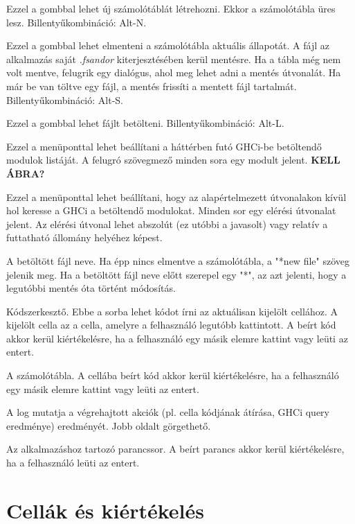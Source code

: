 \begin{compactenum}
	\item Ezzel a gombbal lehet új számolótáblát létrehozni. Ekkor a számolótábla üres lesz. Billentyűkombináció: Alt-N.
	\item Ezzel a gombbal lehet elmenteni a számolótábla aktuális állapotát. A fájl az alkalmazás saját \textit{.fsandor} kiterjesztésében kerül mentésre. Ha a tábla még nem volt mentve, felugrik egy dialógus, ahol meg lehet adni a mentés útvonalát. Ha már be van töltve egy fájl, a mentés frissíti a mentett fájl tartalmát. Billentyűkombináció: Alt-S.
	\item Ezzel a gombbal lehet fájlt betölteni. Billentyűkombináció: Alt-L.
	\item Ezzel a menüponttal lehet beállítani a háttérben futó GHCi-be betöltendő modulok listáját. A felugró szövegmező minden sora egy modult jelent. \textbf{KELL ÁBRA?}
	\item Ezzel a menüponttal lehet beállítani, hogy az alapértelmezett útvonalakon kívül hol keresse a GHCi a betöltendő modulokat. Minden sor egy elérési útvonalat jelent. Az elérési útvonal lehet abszolút (ez utóbbi a javasolt) vagy relatív a futtatható állomány helyéhez képest.
	\item A betöltött fájl neve. Ha épp nincs elmentve a számolótábla, a "*new file" szöveg jelenik meg. Ha a betöltött fájl neve előtt szerepel egy "*", az azt jelenti, hogy a legutóbbi mentés óta történt módosítás.
	\item Kódszerkesztő. Ebbe a sorba lehet kódot írni az aktuálisan kijelölt cellához. A kijelölt cella az a cella, amelyre a felhasználó legutóbb kattintott. A beírt kód akkor kerül kiértékelésre, ha a felhasználó egy másik elemre kattint vagy leüti az entert.
	\item A számolótábla. A cellába beírt kód akkor kerül kiértékelésre, ha a felhasználó egy másik elemre kattint vagy leüti az entert.
	\item A log mutatja a végrehajtott akciók (pl. cella kódjának átírása, GHCi query eredménye) eredményét. Jobb oldalt görgethető.
	\item Az alkalmazáshoz tartozó parancssor. A beírt parancs akkor kerül kiértékelésre, ha a felhasználó leüti az entert.
\end{compactenum}

\section{Cellák és kiértékelés}

